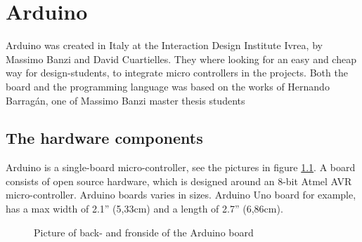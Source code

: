 \chapter{Arduino}\label{analysis:arduino}
Arduino was created in Italy at the Interaction Design Institute Ivrea, by Massimo Banzi and David Cuartielles. They where looking for an easy and cheap way for design-students, to integrate micro controllers in the projects\cite{arduino:hist}. Both the board and the programming language was based on the works of Hernando Barragán, one of Massimo Banzi master thesis students \cite{Wiring:thesis}

\section{The hardware components}
Arduino is a single-board micro-controller, see the pictures in figure \ref{fig:Arduino}.
A board consists of open source hardware, which is designed around an 8-bit Atmel AVR micro-controller. Arduino boards varies in sizes. Arduino Uno board for example, has a max width of 2.1'' (5,33cm) and a length of 2.7'' (6,86cm).  \\

\par
{}
\hfill
{}
\begin{figure}[H]
\caption{Picture of back- and fronside of the Arduino board \cite{Arduino_board_pics}}
\label{fig:Arduino}
\end{figure}
\par

